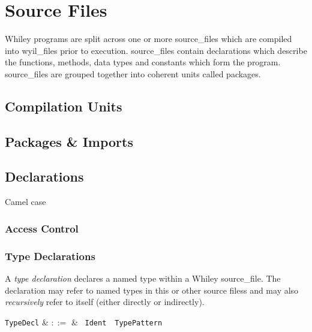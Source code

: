 \chapter{Source Files}

Whiley programs are split across one or more \gls{source_file}s which
are compiled into \gls{wyil_file}s prior to execution.
\Gls{source_file}s contain declarations which describe the functions,
methods, data types and constants which form the program.
\Gls{source_file}s are grouped together into coherent units called
\gls{package}s.


\section{Compilation Units}

\section{Packages \& Imports}

\section{Declarations}

Camel case

\subsection{Access Control}


\subsection{Type Declarations}

A {\em type declaration} declares a named type within a Whiley
\gls{source_file}.  The declaration may refer to named types in this
or other source filess and may also {\em recursively}
refer to itself (either directly or indirectly).

\begin{syntax}
  \verb+TypeDecl+ & $::=$ & \ \verb+Ident+\ \
  \verb+TypePattern+\ \\
\end{syntax}

